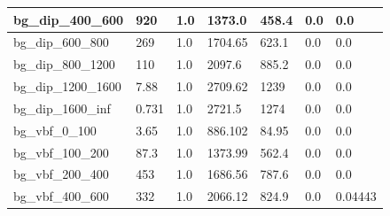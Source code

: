 \documentclass[a4paper, 10pt]{article}
\begin{document}
\begin{table}[H]
\begin{center}
\begin{tabular}{|m{23.0mm}|m{23.0mm}|m{18.0mm}|m{19.0mm}|m{19.0mm}|m{19.0mm}|m{19.0mm}|}
      \hline
      {\cellcolor{white}         bg\_dip\_400\_600}& {\cellcolor{white}         920}& {\cellcolor{white}         1.0}& {\cellcolor{white}         1373.0}& {\cellcolor{white}         458.4}& {\cellcolor{green}         0.0}& {\cellcolor{green}         0.0}\\
      \hline
      {\cellcolor{white}         bg\_dip\_600\_800}& {\cellcolor{white}         269}& {\cellcolor{white}         1.0}& {\cellcolor{white}         1704.65}& {\cellcolor{white}         623.1}& {\cellcolor{green}         0.0}& {\cellcolor{green}         0.0}\\
      \hline
      {\cellcolor{white}         bg\_dip\_800\_1200}& {\cellcolor{white}         110}& {\cellcolor{white}         1.0}& {\cellcolor{white}         2097.6}& {\cellcolor{white}         885.2}& {\cellcolor{green}         0.0}& {\cellcolor{green}         0.0}\\
      \hline
      {\cellcolor{white}         bg\_dip\_1200\_1600}& {\cellcolor{white}         7.88}& {\cellcolor{white}         1.0}& {\cellcolor{white}         2709.62}& {\cellcolor{white}         1239}& {\cellcolor{green}         0.0}& {\cellcolor{green}         0.0}\\
      \hline
      {\cellcolor{white}         bg\_dip\_1600\_inf}& {\cellcolor{white}         0.731}& {\cellcolor{white}         1.0}& {\cellcolor{white}         2721.5}& {\cellcolor{white}         1274}& {\cellcolor{green}         0.0}& {\cellcolor{green}         0.0}\\
      \hline
      {\cellcolor{white}         bg\_vbf\_0\_100}& {\cellcolor{white}         3.65}& {\cellcolor{white}         1.0}& {\cellcolor{white}         886.102}& {\cellcolor{white}         84.95}& {\cellcolor{green}         0.0}& {\cellcolor{green}         0.0}\\
      \hline
      {\cellcolor{white}         bg\_vbf\_100\_200}& {\cellcolor{white}         87.3}& {\cellcolor{white}         1.0}& {\cellcolor{white}         1373.99}& {\cellcolor{white}         562.4}& {\cellcolor{green}         0.0}& {\cellcolor{green}         0.0}\\
      \hline
      {\cellcolor{white}         bg\_vbf\_200\_400}& {\cellcolor{white}         453}& {\cellcolor{white}         1.0}& {\cellcolor{white}         1686.56}& {\cellcolor{white}         787.6}& {\cellcolor{green}         0.0}& {\cellcolor{green}         0.0}\\
      \hline
      {\cellcolor{white}         bg\_vbf\_400\_600}& {\cellcolor{white}         332}& {\cellcolor{white}         1.0}& {\cellcolor{white}         2066.12}& {\cellcolor{white}         824.9}& {\cellcolor{green}         0.0}& {\cellcolor{green}         0.04443}\\

\end{tabular}
\end{center}
\end{table}
\end{document}
